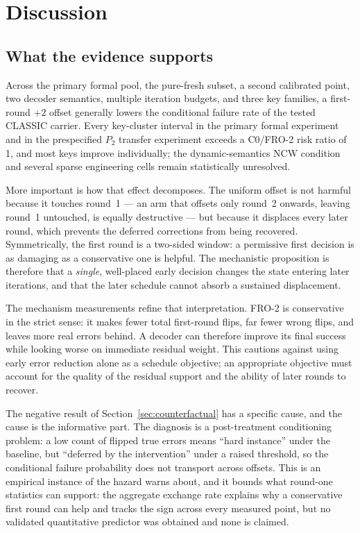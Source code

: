 \documentclass[lettersize,journal]{IEEEtran}
\begin{document}
\section{Discussion}\label{sec:discussion}

\subsection{What the evidence supports}

Across the primary formal pool, the pure-fresh subset, a second calibrated point, two decoder semantics, multiple iteration budgets, and three key families, a first-round $+2$ offset generally lowers the conditional failure rate of the tested CLASSIC carrier. Every key-cluster interval in the primary formal experiment and in the prespecified $P_2$ transfer experiment exceeds a C0/FRO-2 risk ratio of 1, and most keys improve individually; the dynamic-semantics NCW condition and several sparse engineering cells remain statistically unresolved.

More important is how that effect decomposes. The uniform offset is not harmful because it touches round~1 --- an arm that offsets only round~2 onwards, leaving round~1 untouched, is equally destructive --- but because it displaces every later round, which prevents the deferred corrections from being recovered. Symmetrically, the first round is a two-sided window: a permissive first decision is as damaging as a conservative one is helpful. The mechanistic proposition is therefore that a \emph{single}, well-placed early decision changes the state entering later iterations, and that the later schedule cannot absorb a sustained displacement.

The mechanism measurements refine that interpretation. FRO-2 is conservative in the strict sense: it makes fewer total first-round flips, far fewer wrong flips, and leaves more real errors behind. A decoder can therefore improve its final success while looking worse on immediate residual weight. This cautions against using early error reduction alone as a schedule objective; an appropriate objective must account for the quality of the residual support and the ability of later rounds to recover.

The negative result of Section~\ref{sec:counterfactual} has a specific cause, and the cause is the informative part. The diagnosis is a post-treatment conditioning problem: a low count of flipped true errors means ``hard instance'' under the baseline, but ``deferred by the intervention'' under a raised threshold, so the conditional failure probability does not transport across offsets. This is an empirical instance of the hazard \cite{annechini2025closedform} warns about, and it bounds what round-one statistics can support: the aggregate exchange rate explains why a conservative first round can help and tracks the sign across every measured point, but no validated quantitative predictor was obtained and none is claimed.
\end{document}
